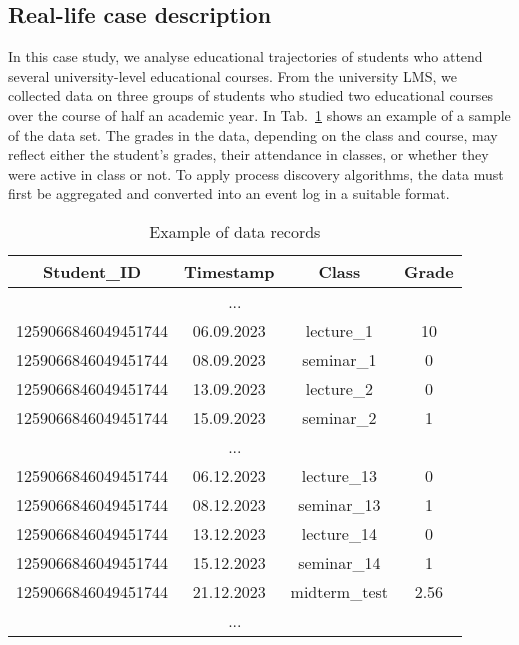 \documentclass[11pt]{article}
\theoremstyle{definition}
\begin{document}
\subsection{Real-life case description}\label{sec:data}

In this case study, we analyse educational trajectories of students who attend several university-level educational courses.
From the university LMS, we collected data on three groups of students who studied two educational courses over the course of half an academic year. 
In Tab.~\ref{tbl:data} shows an example of a sample of the data set. 
The grades in the data, depending on the class and course, may reflect either the student's grades, their attendance in classes, or whether they were active in class or not. To apply process discovery algorithms, the data must first be aggregated and converted into an event log in a suitable format.

\begin{table}[htb]
    \centering
    \caption{Example of data records}
    
    \begin{tabular}{c c c c} 
    \textbf{Student\_ID} & \textbf{Timestamp} & \textbf{Class} & \textbf{Grade} \\ \hline\hline
    \multicolumn{4}{c}{...}\\
    \hline
    1259066846049451744 & 06.09.2023 & lecture\_1 & 10 \\
    \hline
    1259066846049451744 & 08.09.2023 & seminar\_1 & 0 \\
    \hline
    1259066846049451744 & 13.09.2023 & lecture\_2 & 0 \\
    \hline
    1259066846049451744 & 15.09.2023 & seminar\_2 & 1 \\
    \hline
    \multicolumn{4}{c}{...}\\
    \hline
    1259066846049451744 & 06.12.2023 & lecture\_13 & 0 \\
    \hline
    1259066846049451744 & 08.12.2023 & seminar\_13 & 1 \\
    \hline
    1259066846049451744 & 13.12.2023 & lecture\_14 & 0 \\
    \hline
    1259066846049451744 & 15.12.2023 & seminar\_14 & 1 \\
    \hline
    1259066846049451744 & 21.12.2023 & midterm\_test & 2.56 \\
    \hline
    \multicolumn{4}{c}{...}\\
    \hline\hline
    \end{tabular}
  \label{tbl:data}
\end{table}
\end{document}

